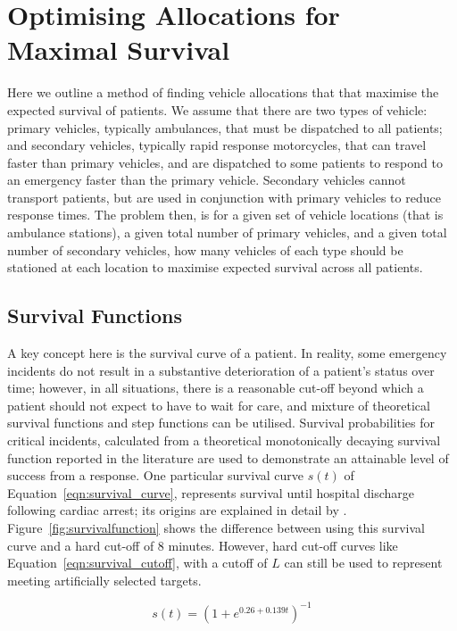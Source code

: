 \documentclass[preprint,12pt]{elsarticle}
\begin{document}
\section{Optimising Allocations for Maximal Survival}\label{sec:optimising}
Here we outline a method of finding vehicle allocations that that maximise the
expected survival of patients.
We assume that there are two types of vehicle: primary vehicles, typically
ambulances, that must be dispatched to all patients; and secondary vehicles,
typically rapid response motorcycles, that can travel faster than primary
vehicles, and are dispatched to some patients to respond to an emergency
faster than the primary vehicle. Secondary vehicles cannot transport patients,
but are used in conjunction with primary vehicles to reduce response times.
The problem then, is for a given set of vehicle locations (that is ambulance
stations), a given total number of primary vehicles, and a given total number
of secondary vehicles, how many vehicles of each type should be stationed at
each location to maximise expected survival across all patients.


\subsection{Survival Functions}\label{sec:survival}
A key concept here is the survival curve of a patient.
In reality, some emergency incidents do not result in a substantive
deterioration of a patient’s status over time; however, in all situations,
there is a reasonable cut-off beyond which a patient should not expect to have
to wait for care, and mixture of theoretical survival functions and step
functions can be utilised.
Survival probabilities for critical incidents, calculated from a theoretical
monotonically decaying survival function reported in the literature
\cite{Valenzuela20001206} are used to demonstrate an attainable level of
success from a response. One particular survival curve $s(t)$ of
Equation~\ref{eqn:survival_curve}, represents survival until hospital
discharge following cardiac arrest; its origins are explained in detail by
\cite{Knight2012918}. Figure~\ref{fig:survivalfunction} shows the difference
between using this survival curve and a hard cut-off of 8 minutes.
However, hard cut-off curves like Equation~\ref{eqn:survival_cutoff}, with a
cutoff of $L$ can still be used to represent meeting artificially selected
targets.

\begin{equation}\label{eqn:survival_curve}
    s(t) = \left(1 + e^{0.26+0.139t}\right)^{-1}
\end{equation}
\end{document}
